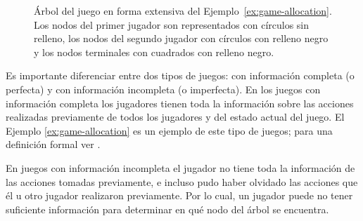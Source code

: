 \begin{figure}[h]
\begin{center}
\caption[Árbol del juego en forma extensiva del Ejemplo~\ref{ex:game-allocation}.]{Árbol del juego en forma extensiva del Ejemplo~\ref{ex:game-allocation}. Los nodos del primer jugador son representados con círculos sin relleno, los nodos del segundo jugador con círculos con relleno negro y los nodos terminales con cuadrados con relleno negro.}
\label{fig:game-allocation}
\end{center}
\end{figure}

Es importante diferenciar entre dos tipos de juegos: con información completa (o perfecta) y con información incompleta (o imperfecta). En los juegos con información completa los jugadores tienen toda la información sobre las acciones realizadas previamente de todos los jugadores y del estado actual del juego. El Ejemplo \ref{ex:game-allocation} es un ejemplo de este tipo de juegos; para una definición formal ver \cite[pp. 89--90]{bib:course-game-theory}.

En juegos con información incompleta el jugador no tiene toda la información de las acciones tomadas previamente, e incluso pudo haber olvidado las acciones que él u otro jugador realizaron previamente. Por lo cual, un jugador puede no tener suficiente información para determinar en qué nodo del árbol se encuentra. 

